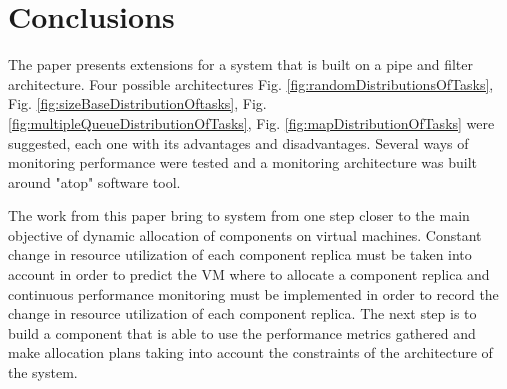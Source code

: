 \section*{Conclusions}
The paper presents extensions for a system that is built on a pipe and filter architecture. Four possible architectures Fig. \ref{fig:randomDistributionsOfTasks}, Fig. \ref{fig:sizeBaseDistributionOftasks}, Fig. \ref{fig:multipleQueueDistributionOfTasks}, Fig. \ref{fig:mapDistributionOfTasks} were suggested, each one with its advantages and disadvantages. Several ways of monitoring performance were tested and a monitoring architecture was built around "atop" software tool. 

The work from this paper bring to system from \cite{IrimieAndPetcu} one step closer to the main objective of dynamic allocation of components on virtual machines. Constant change in resource utilization of each component replica must be taken into account in order to predict the VM where to allocate a component replica and continuous performance monitoring must be implemented in order to record the change in resource utilization of each component replica. The next step is to build a component that is able to use the performance metrics gathered and make allocation plans taking into account the constraints of the architecture of the system.